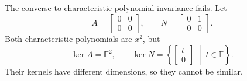 \begin{example}
  \label{ex:linear-algebra-i:same-polynomial-not-similar}
  The converse to characteristic-polynomial invariance fails. Let
  \[
    A=\begin{bmatrix}0&0\\0&0\end{bmatrix},\qquad
    N=\begin{bmatrix}0&1\\0&0\end{bmatrix}.
  \]
  Both characteristic polynomials are \(x^2\), but
  \[
    \ker A=\mathbb F^2,\qquad
    \ker N=\left\{\begin{bmatrix}t\\0\end{bmatrix}\;\middle|\;t\in\mathbb F\right\}.
  \]
  Their kernels have different dimensions, so they cannot be similar.
\end{example}
